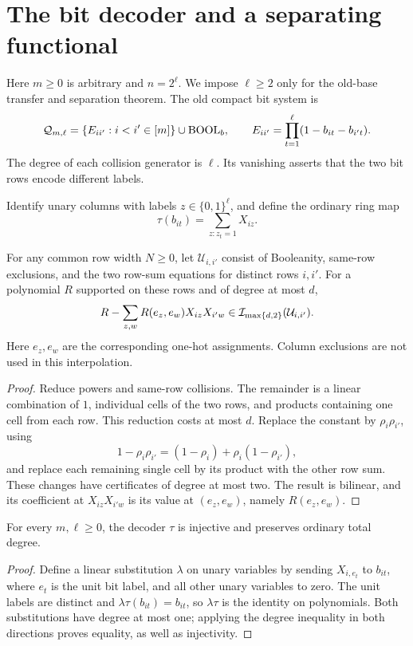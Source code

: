 \section{The bit decoder and a separating functional}\label{sec:decoder}

Here \(m\ge0\) is arbitrary and \(n=2^\ell\). We impose \(\ell\ge2\)
only for the old-base transfer and separation theorem.
The old compact bit system is
\begin{equation}\label{eq:compact-base}
 \mathcal Q_{m,\ell}
  =\{E_{ii'}:i<i'\in[m]\}\cup\operatorname{BOOL}_b,
 \qquad
 E_{ii'}=\prod_{t=1}^{\ell}(1-b_{it}-b_{i't}).
\end{equation}
The degree of each collision generator is \(\ell\).
Its vanishing asserts that the two bit rows encode different labels.

Identify unary columns with labels \(z\in\{0,1\}^{\ell}\), and define the
ordinary ring map
\begin{equation}\label{eq:decoder}
 \tau(b_{it})=\sum_{z:z_t=1}X_{iz}.
\end{equation}

\begin{lemma}\label{lem:interpolation}
For any common row width \(N\ge0\), let \(\mathcal U_{i,i'}\) consist of Booleanity, same-row exclusions,
and the two row-sum equations for distinct rows \(i,i'\).
For a polynomial \(R\) supported on these rows and of degree at most \(d\),
\[
 R-\sum_{z,w}R(e_z,e_w)X_{iz}X_{i'w}
     \in\mathcal I_{\max\{d,2\}}(\mathcal U_{i,i'}).
\]
Here \(e_z,e_w\) are the corresponding one-hot assignments.
Column exclusions are not used in this interpolation.
\end{lemma}
\begin{proof}
Reduce powers and same-row collisions. The remainder is a linear
combination of \(1\), individual cells of the two rows, and products
containing one cell from each row. This reduction costs at most \(d\).
Replace the constant by \(\rho_i\rho_{i'}\), using
\[
 1-\rho_i\rho_{i'}=(1-\rho_i)+\rho_i(1-\rho_{i'}),
\]
and replace each remaining single cell by its product with the other
row sum. These changes have certificates of degree at most two.
The result is bilinear, and its coefficient at \(X_{iz}X_{i'w}\)
is its value at \((e_z,e_w)\), namely \(R(e_z,e_w)\).
\end{proof}


\begin{lemma}\label{lem:decoder-injective}
For every \(m,\ell\ge0\), the decoder \(\tau\) is injective and preserves
ordinary total degree.
\end{lemma}
\begin{proof}
Define a linear substitution \(\lambda\) on unary variables by sending
\(X_{i,e_t}\) to \(b_{it}\), where \(e_t\) is the unit bit label, and
all other unary variables to zero. The unit labels are distinct and
\(\lambda\tau(b_{it})=b_{it}\), so \(\lambda\tau\) is the identity
on polynomials. Both substitutions have degree at most one; applying the
degree inequality in both directions proves equality, as well as injectivity.
\end{proof}

